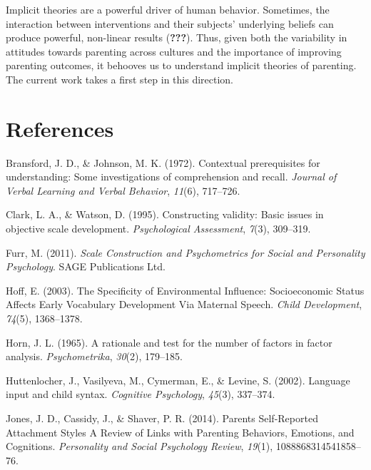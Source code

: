 \documentclass[floatsintext,man]{apa6}
\theoremstyle{definition}
\theoremstyle{definition}
\theoremstyle{definition}
\theoremstyle{remark}
\begin{document}
Implicit theories are a powerful driver of human behavior. Sometimes,
the interaction between interventions and their subjects' underlying
beliefs can produce powerful, non-linear results ({\textbf{???}}). Thus,
given both the variability in attitudes towards parenting across
cultures and the importance of improving parenting outcomes, it behooves
us to understand implicit theories of parenting. The current work takes
a first step in this direction.

\newpage

\section{References}\label{references}

\begingroup
\setlength{\parindent}{-0.5in} \setlength{\leftskip}{0.5in}

\hypertarget{refs}{}
\hypertarget{ref-bransford1972}{}
Bransford, J. D., \& Johnson, M. K. (1972). Contextual prerequisites for
understanding: Some investigations of comprehension and recall.
\emph{Journal of Verbal Learning and Verbal Behavior}, \emph{11}(6),
717--726.

\hypertarget{ref-clark1995}{}
Clark, L. A., \& Watson, D. (1995). Constructing validity: Basic issues
in objective scale development. \emph{Psychological Assessment},
\emph{7}(3), 309--319.

\hypertarget{ref-furr2011}{}
Furr, M. (2011). \emph{Scale Construction and Psychometrics for Social
and Personality Psychology}. SAGE Publications Ltd.

\hypertarget{ref-hoff2003}{}
Hoff, E. (2003). The Specificity of Environmental Influence:
Socioeconomic Status Affects Early Vocabulary Development Via Maternal
Speech. \emph{Child Development}, \emph{74}(5), 1368--1378.

\hypertarget{ref-horn1965}{}
Horn, J. L. (1965). A rationale and test for the number of factors in
factor analysis. \emph{Psychometrika}, \emph{30}(2), 179--185.

\hypertarget{ref-huttenlocher2002}{}
Huttenlocher, J., Vasilyeva, M., Cymerman, E., \& Levine, S. (2002).
Language input and child syntax. \emph{Cognitive Psychology},
\emph{45}(3), 337--374.

\hypertarget{ref-jones2014}{}
Jones, J. D., Cassidy, J., \& Shaver, P. R. (2014). Parents
Self-Reported Attachment Styles A Review of Links with Parenting
Behaviors, Emotions, and Cognitions. \emph{Personality and Social
Psychology Review}, \emph{19}(1), 1088868314541858--76.
\end{document}
